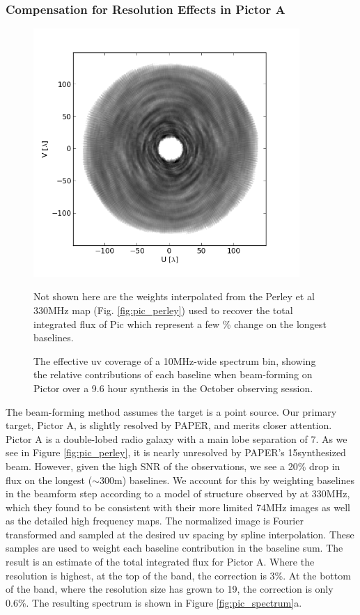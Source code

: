 \documentclass[preprint]{aastex}
\begin{document}
\subsubsection{Compensation for Resolution Effects in Pictor A}

\begin{figure}
\includegraphics[width=0.9\textwidth]{plots/PicA_Oct2011_uv_coverage.png}
\caption{The effective uv coverage of a 10MHz-wide spectrum bin, showing the relative contributions of each baseline when beam-forming on Pictor over a 9.6 hour synthesis in the October observing session. \label{fig:uv_coverage}}
Not shown here are the weights interpolated from the Perley et al 330MHz map (Fig. \ref{fig:pic_perley}) used to recover the total integrated flux of Pic  which represent a few \% change on the longest baselines.
\end{figure}

The beam-forming method assumes the target is a point source. Our primary
target, Pictor A, is slightly resolved by PAPER, and merits closer attention.
Pictor A is a double-lobed radio galaxy with a main lobe separation of
7\arcmin. As we see in Figure \ref{fig:pic_perley}, it is nearly unresolved by
PAPER's 15\arcmin synthesized beam. However, given the high SNR of the
observations, we see a 20\% drop in flux on the longest ($\sim$300m) baselines. 
We account for this by weighting baselines
in the beamform step according to a model of structure observed by
\citet{Perley:1997p9312} at 330MHz, which they found to be consistent with
their more limited 74MHz images as well as the detailed high frequency maps.
The normalized image is Fourier transformed and sampled at the desired uv
spacing by spline interpolation. These samples are used to weight each baseline
contribution in the baseline sum. The result is an estimate of the total
integrated flux for Pictor A. Where the resolution is highest, at the top of
the band, the correction is 3\%. At the bottom of the band, where the
resolution size has grown to 19\arcmin, the correction is only 0.6\%. The
resulting spectrum is shown in Figure \ref{fig:pic_spectrum}a.
\end{document}
